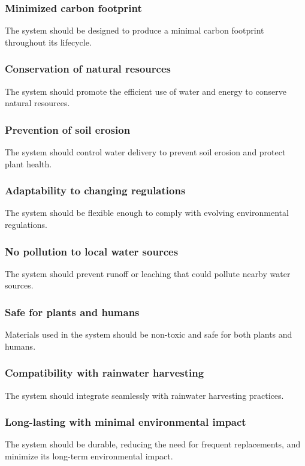 \documentclass[11pt]{article}
\begin{document}
\subsubsection{Minimized carbon footprint}
The system should be designed to produce a minimal carbon footprint throughout its lifecycle.

\subsubsection{Conservation of natural resources}
The system should promote the efficient use of water and energy to conserve natural resources.

\subsubsection{Prevention of soil erosion}
The system should control water delivery to prevent soil erosion and protect plant health.

\subsubsection{Adaptability to changing regulations}
The system should be flexible enough to comply with evolving environmental regulations.

\subsubsection{No pollution to local water sources}
The system should prevent runoff or leaching that could pollute nearby water sources.

\subsubsection{Safe for plants and humans}
Materials used in the system should be non-toxic and safe for both plants and humans.

\subsubsection{Compatibility with rainwater harvesting}
The system should integrate seamlessly with rainwater harvesting practices.

\subsubsection{Long-lasting with minimal environmental impact}
The system should be durable, reducing the need for frequent replacements, and minimize its long-term environmental impact.
\end{document}
